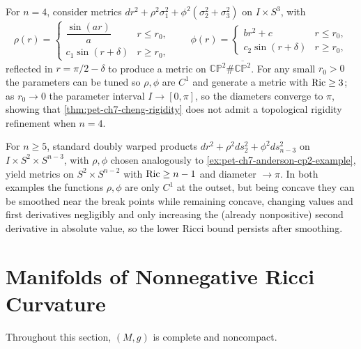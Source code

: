\begin{example}
  \label{ex:pet-ch7-anderson-cp2-example}
  For $n=4$, consider metrics $dr^2+\rho^2\sigma_1^2+\phi^2(\sigma_2^2+\sigma_3^2)$
  on $I\times S^3$, with
  \[
    \rho(r)=\begin{cases}\dfrac{\sin(ar)}{a}&r\le r_0,\\c_1\sin(r+\delta)&r\ge
    r_0,\end{cases}\qquad
    \phi(r)=\begin{cases}br^2+c&r\le r_0,\\c_2\sin(r+\delta)&r\ge
    r_0,\end{cases}
  \]
  reflected in $r=\pi/2-\delta$ to produce a metric on $\mathbb{CP}^2\#\overline{\mathbb{CP}^2}$.
  For any small $r_0>0$ the parameters can be tuned so $\rho,\phi$ are $C^1$
  and generate a metric with $\operatorname{Ric}\ge3$; as $r_0\to0$ the parameter interval
  $I\to[0,\pi]$, so the diameters converge to $\pi$, showing that
  \cref{thm:pet-ch7-cheng-rigidity} does not admit a topological rigidity
  refinement when $n=4$.
\end{example}

\begin{example}
  \label{ex:pet-ch7-otsu-example}
  For $n\ge5$, standard doubly warped products $dr^2+\rho^2ds_2^2+\phi^2ds^2_{n-3}$
  on $I\times S^2\times S^{n-3}$, with $\rho,\phi$ chosen analogously to
  \cref{ex:pet-ch7-anderson-cp2-example}, yield metrics on $S^2\times
  S^{n-2}$ with $\operatorname{Ric}\ge n-1$ and diameter $\to\pi$. In both examples the
  functions $\rho,\phi$ are only $C^1$ at the outset, but being concave they
  can be smoothed near the break points while remaining concave, changing
  values and first derivatives negligibly and only increasing the (already
  nonpositive) second derivative in absolute value, so the lower Ricci bound
  persists after smoothing.
\end{example}

\section{Manifolds of Nonnegative Ricci Curvature}

Throughout this section, $(M,g)$ is complete and noncompact.

